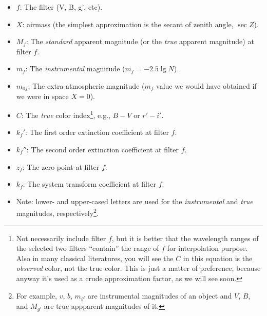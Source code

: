 \begin{itemize}
\item $ f $: The filter (V, B, g', etc).
\item $ X $: airmass (the simplest approximation is the secant of zenith angle, $ \sec Z $).
\item $ M_f $: The \emph{standard} apparent magnitude (or the \emph{true} apparent magnitude) at filter $ f $.
\item $ m_f $: The \emph{instrumental} magnitude ($ m_f = -2.5 \lg N $).
\item $ m_{0f} $: The extra-atmospheric magnitude ($ m_f $ value we would have obtained if we were in space $ X = 0 $).
\item $ C $: The \emph{true} color index\footnote{Not necessarily include filter $ f $, but it is better that the wavelength ranges of the selected two filters ``contain'' the range of $ f $ for interpolation purpose. Also in many classical literatures, you will see the $ C $ in this equation is the \textit{observed} color, not the true color. This is just a matter of preference, because anyway it's used as a crude approximation factor, as we will see soon.}, e.g., $ B - V $ or $ r' - i' $.
\item $ k_f' $: The first order extinction coefficient at filter $ f $.
\item $ k_f'' $: The second order extinction coefficient at filter $ f $.
\item $ z_f $: The zero point at filter $ f $.
\item $ k_f $: The system transform coefficient at filter $ f $.
\item Note: lower- and upper-cased letters are used for the \emph{instrumental} and \emph{true} magnitudes, respectively\footnote{For example, $ v $, $ b $, $ m_{g'} $ are instrumental magnitudes of an object and $ V $, $ B $, and $ M_{g'} $ are true appparent magnitudes of it.}.
\end{itemize}


